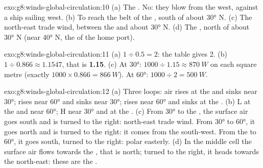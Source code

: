\begin{solution}{exo:g8:winds-global-circulation:10}
(a) The . No: they blow from the west, against a ship sailing
west. (b) To reach the belt of the , south of about \ang{30}
N. (c) The north-east trade wind, between the  and about \ang{30}
N. (d) The , north of about \ang{30} N (near \ang{40} N, the
 of the home port).
\end{solution}

\begin{solution}{exo:g8:winds-global-circulation:11}
(a) $1 \div 0.5 = 2$: the table gives 2. (b) $1 \div 0.866 \approx
1.1547$, that is \textbf{1.15}. (c) At \ang{30}: $1000 \div 1.15 \approx
\qty{870}{W}$ on each square metre (exactly $1000 \times 0.866 =
\qty{866}{W}$). At \ang{60}: $1000 \div 2 = \qty{500}{W}$.
\end{solution}

\begin{solution}{exo:g8:winds-global-circulation:12}
(a) Three loops: air rises at the  and sinks near \ang{30};
rises near \ang{60} and sinks near \ang{30}; rises near \ang{60} and sinks
at the . (b) L at the  and near \ang{60}; H near \ang{30} and
at the . (c) From \ang{30} to the , the surface air goes south
and is turned to the right: north-east trade wind. From \ang{30} to
\ang{60}, it goes north and is turned to the right: it comes from the
south-west. From the  to \ang{60}, it goes south, turned to the
right: polar easterly. (d) In the middle cell the surface air flows
towards the , that is north; turned to the right, it heads towards
the north-east: these are the .
\end{solution}

